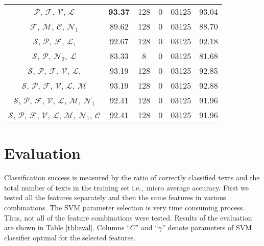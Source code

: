 \documentclass{llncs}
\begin{document}
\begin{table*}[htb]
\begin{center}
\begin{tabular}{c c c r@{.}l c}
$\mathcal{P}$, $\mathcal{F}$, $\mathcal{V}$, $\mathcal{L}$ & \textbf{93.37} &
128 & 0 & 03125 & 93.04\\
$\mathcal{F}$, $\mathcal{M}$, $\mathcal{C}$, $\mathcal{N}_1$ & 89.62 & 128 & 0
& 03125 & 88.70\\
$\mathcal{S}$, $\mathcal{P}$, $\mathcal{F}$, $\mathcal{L}$, & 92.67 & 128 & 0 &
03125 & 92.18\\
$\mathcal{S}$, $\mathcal{P}$, $\mathcal{N}_2$, $\mathcal{L}$ & 83.33 & 8 & 0 &
03125 & 81.68\\
$\mathcal{S}$, $\mathcal{P}$, $\mathcal{F}$, $\mathcal{V}$, $\mathcal{L}$, &
93.19 & 128 & 0 & 03125 & 92.85\\
$\mathcal{S}$, $\mathcal{P}$, $\mathcal{F}$, $\mathcal{V}$, $\mathcal{L}$,
$\mathcal{M}$ & 93.19 & 128 & 0 & 03125 & 92.88\\
$\mathcal{S}$, $\mathcal{P}$, $\mathcal{F}$, $\mathcal{V}$,
$\mathcal{L}$, $\mathcal{M}$, $\mathcal{N}_1$ & 92.41 & 128 & 0 & 03125 & 91.96\\
$\mathcal{S}$, $\mathcal{P}$, $\mathcal{F}$, $\mathcal{V}$, $\mathcal{L}$,
$\mathcal{M}$, $\mathcal{N}_1$, $\mathcal{C}$ & 92.41 & 128 & 0 & 03125 &
91.96\\
\bottomrule%
\end{tabular}%
\label{tbl:eval}%
\end{center}
\end{table*}

\section{Evaluation}
\label{sec:evaluacija}
Classification success is measured by the ratio of correctly classified texts and
the total number of texts in the training set i.e.,~micro average accuracy.
First we tested all the features separately and then the same features in
various combinations. The SVM parameter selection is very time
consuming process. Thus, not all of the feature combinations were tested. Results of the evaluation
are shown in Table \ref{tbl:eval}. Columns ``$C$'' and ``$\gamma$'' denote
parameters of SVM classifier optimal for the selected features.

\end{document}
